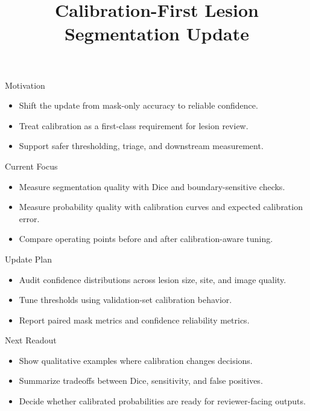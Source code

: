 \documentclass{beamer}
\title{Calibration-First Lesion Segmentation Update}
\author{}
\date{}
\begin{document}
\begin{frame}
  \titlepage
\end{frame}

\begin{frame}{Motivation}
  \begin{itemize}
    \item Shift the update from mask-only accuracy to reliable confidence.
    \item Treat calibration as a first-class requirement for lesion review.
    \item Support safer thresholding, triage, and downstream measurement.
  \end{itemize}
\end{frame}

\begin{frame}{Current Focus}
  \begin{itemize}
    \item Measure segmentation quality with Dice and boundary-sensitive checks.
    \item Measure probability quality with calibration curves and expected calibration error.
    \item Compare operating points before and after calibration-aware tuning.
  \end{itemize}
\end{frame}

\begin{frame}{Update Plan}
  \begin{itemize}
    \item Audit confidence distributions across lesion size, site, and image quality.
    \item Tune thresholds using validation-set calibration behavior.
    \item Report paired mask metrics and confidence reliability metrics.
  \end{itemize}
\end{frame}

\begin{frame}{Next Readout}
  \begin{itemize}
    \item Show qualitative examples where calibration changes decisions.
    \item Summarize tradeoffs between Dice, sensitivity, and false positives.
    \item Decide whether calibrated probabilities are ready for reviewer-facing outputs.
  \end{itemize}
\end{frame}
\end{document}
